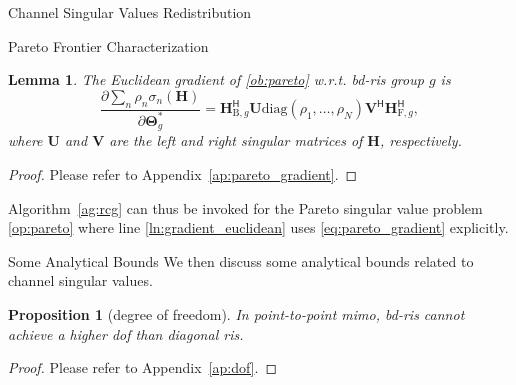 \documentclass[journal]{IEEEtran}
\newtheorem{proposition}{Proposition}
\newtheorem{lemma}{Lemma}
\begin{document}
\begin{section}{Channel Singular Values Redistribution}
\begin{subsection}{Pareto Frontier Characterization}
		\begin{lemma}\label{lm:pareto_gradient}
			The Euclidean gradient of \eqref{ob:pareto} w.r.t. \gls{bd}-\gls{ris} group $g$ is
			\begin{equation}
				\frac{\partial \sum_n \rho_n \sigma_n(\mathbf{H})}{\partial \mathbf{\Theta}_g^*} = \mathbf{H}_{\mathrm{B},g}^\mathsf{H} \mathbf{U} \mathrm{diag}(\rho_1,\ldots,\rho_N) \mathbf{V}^\mathsf{H} \mathbf{H}_{\mathrm{F},g}^\mathsf{H},
				\label{eq:pareto_gradient}
			\end{equation}
			where $\mathbf{U}$ and $\mathbf{V}$ are the left and right singular matrices of $\mathbf{H}$, respectively.
		\end{lemma}
		\begin{proof}
			Please refer to Appendix~\ref{ap:pareto_gradient}.
		\end{proof}

		Algorithm~\ref{ag:rcg} can thus be invoked for the Pareto singular value problem \eqref{op:pareto} where line \ref{ln:gradient_euclidean} uses \eqref{eq:pareto_gradient} explicitly.
	\end{subsection}

	\begin{subsection}{Some Analytical Bounds}\label{sc:bounds}
		We then discuss some analytical bounds related to channel singular values.
		\begin{proposition}[degree of freedom]\label{pp:dof}
			In point-to-point \gls{mimo}, \gls{bd}-\gls{ris} cannot achieve a higher \gls{dof} than diagonal \gls{ris}.
		\end{proposition}
		\begin{proof}
			Please refer to Appendix~\ref{ap:dof}.
		\end{proof}


\end{subsection}
\end{section}
\end{document}
